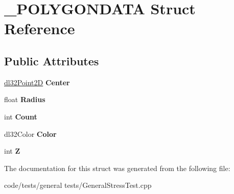 \hypertarget{struct___p_o_l_y_g_o_n_d_a_t_a}{\section{\-\_\-\-P\-O\-L\-Y\-G\-O\-N\-D\-A\-T\-A Struct Reference}
\label{struct___p_o_l_y_g_o_n_d_a_t_a}
}
\subsection*{Public Attributes}
\begin{DoxyCompactItemize}
\item 
\hypertarget{struct___p_o_l_y_g_o_n_d_a_t_a_a43d499ba40f89e15c349798a5d5a6dfb}{\hyperlink{structdl32_point2_d}{dl32\-Point2\-D} {\bfseries Center}}\label{struct___p_o_l_y_g_o_n_d_a_t_a_a43d499ba40f89e15c349798a5d5a6dfb}

\item 
\hypertarget{struct___p_o_l_y_g_o_n_d_a_t_a_a3491baaf7eaeea5845c4e59eee27b34e}{float {\bfseries Radius}}\label{struct___p_o_l_y_g_o_n_d_a_t_a_a3491baaf7eaeea5845c4e59eee27b34e}

\item 
\hypertarget{struct___p_o_l_y_g_o_n_d_a_t_a_aede9fcfe2b35f39d0e31be3d07fcdb19}{int {\bfseries Count}}\label{struct___p_o_l_y_g_o_n_d_a_t_a_aede9fcfe2b35f39d0e31be3d07fcdb19}

\item 
\hypertarget{struct___p_o_l_y_g_o_n_d_a_t_a_a47b636cbb39aff082978760178de7529}{dl32\-Color {\bfseries Color}}\label{struct___p_o_l_y_g_o_n_d_a_t_a_a47b636cbb39aff082978760178de7529}

\item 
\hypertarget{struct___p_o_l_y_g_o_n_d_a_t_a_a39b3202b5c0c402b8a50067bc680c937}{int {\bfseries Z}}\label{struct___p_o_l_y_g_o_n_d_a_t_a_a39b3202b5c0c402b8a50067bc680c937}

\end{DoxyCompactItemize}


The documentation for this struct was generated from the following file\-:\begin{DoxyCompactItemize}
\item 
code/tests/general tests/General\-Stress\-Test.\-cpp\end{DoxyCompactItemize}
